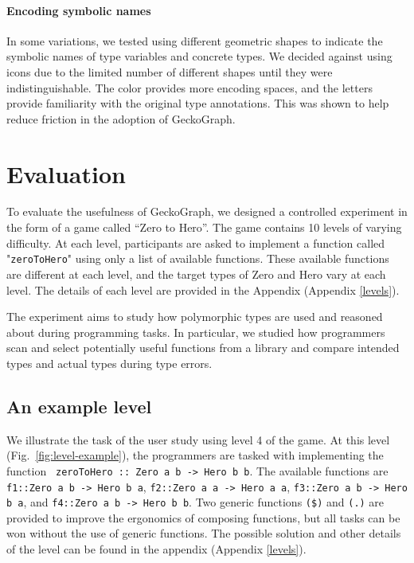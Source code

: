 \paragraph{Encoding symbolic names} In some variations, we tested using different geometric shapes to indicate the symbolic names of type variables and concrete types. We decided against using icons due to the limited number of different shapes until they were indistinguishable. The color provides more encoding spaces, and the letters provide familiarity with the original type annotations. This was shown to help reduce friction in the adoption of GeckoGraph.


\section{Evaluation}
To evaluate the usefulness of GeckoGraph, we designed a controlled experiment in the form of a game called ``Zero to Hero''. The game contains 10 levels of varying difficulty. At each level, participants are asked to implement a function called "\texttt{zeroToHero}" using only a list of available functions. These available functions are different at each level, and the target types of Zero and Hero vary at each level. The details of each level are provided in the Appendix (Appendix \ref{levels}). 

The experiment aims to study how polymorphic types are used and reasoned about during programming tasks. In particular, we studied how programmers scan and select potentially useful functions from a library and compare intended types and actual types during type errors.


\subsection{An example level}
We illustrate the task of the user study using level 4 of the game. At this level (Fig.~\ref{fig:level-example}), the programmers are tasked with implementing the function \texttt{ zeroToHero :: Zero a b -> Hero b b}. The available functions are \texttt{f1::Zero a b -> Hero b a}, \texttt{f2::Zero a a -> Hero a a}, \texttt{f3::Zero a b -> Hero b a}, and \texttt{f4::Zero a b -> Hero b b}. Two generic functions \texttt{(\$)} and \texttt{(.)} are provided to improve the ergonomics of composing functions, but all tasks can be won without the use of generic functions. The possible solution and other details of the level can be found in the appendix (Appendix \ref{levels}).


